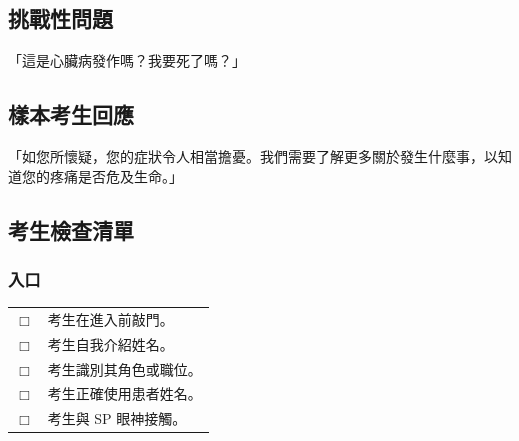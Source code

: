 \documentclass{article}
\newcommand{\checkbox}{\ensuremath{\Box}}
\begin{document}
\subsection{挑戰性問題}
「這是心臟病發作嗎？我要死了嗎？」

\subsection{樣本考生回應}
「如您所懷疑，您的症狀令人相當擔憂。我們需要了解更多關於發生什麼事，以知道您的疼痛是否危及生命。」

\subsection{考生檢查清單}

\subsubsection{入口}
\begin{longtable}{p{} p{}}
\toprule
\checkbox & 考生在進入前敲門。 \\
\checkbox & 考生自我介紹姓名。 \\
\checkbox & 考生識別其角色或職位。 \\
\checkbox & 考生正確使用患者姓名。 \\
\checkbox & 考生與 SP 眼神接觸。 \\
\bottomrule
\end{longtable}
\end{document}
